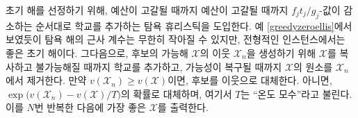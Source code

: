 \documentclass[11pt]{article} %
\newif\ifen
\theoremstyle{definition}
\theoremstyle{definition}
\begin{document}
\ifen
To generate an initial solution, our algorithm adopts the greedy heuristic of adding schools in descending order by $f_j t_j / g_j$ until the budget is exhausted. While Example \ref{greedyzeroellis} shows that the approximation coefficient of this solution can be arbitrarily small, in typical instances, it is much higher. Next, given a candidate solution $\mathcal{X}$, we generate a neighbor $\mathcal{X}_n$ by copying $\mathcal{X}$, adding schools to $\mathcal{X}_n$ until it becomes infeasible, then removing elements of $\mathcal{X}$ from $\mathcal{X}_n$ until feasibility is restored. If $v(\mathcal{X}_n) \geq v(\mathcal{X})$, then the candidate solution is updated to equal the neighbor; if not, then the candidate solution is updated with probability $\exp\bigl(v(\mathcal{X}_n) - v(\mathcal{X}) / T\bigr)$, where $T$ is a temperature parameter. This is repeated $N$ times, and the algorithm returns the best $\mathcal{X}$ observed.
\else
초기 해를 선정하기 위해, 예산이 고갈될 때까지 예산이 고갈될 때까지 $f_j t_j / g_j$-값이 감소하는 순서대로 학교를 추가하는 탐욕 휴리스틱을 도입한다. 예 \ref{greedyzeroellis}에서 보였듯이 탐욕 해의 근사 계수는 무한히 작아질 수 있지만, 전형적인 인스턴스에서는 좋은 초기 해이다. 그다음으로, 후보의 가능해 $\mathcal{X}$의 이웃 $\mathcal{X}_n$을 생성하기 위해 $\mathcal{X}$를 복사하고 불가능해질 때까지 학교를 추가하고, 가능성이 복구될 때까지 $\mathcal{X}$의 원소를 $\mathcal{X}_n$에서 제거한다. 만약 $v(\mathcal{X}_n) \geq v(\mathcal{X})$이면, 후보를 이웃으로 대체한다. 아니면, $\exp\bigl(v(\mathcal{X}_n) - v(\mathcal{X}) / T\bigr)$의 확률로 대체하며, 여기서 $T$는 ``온도 모수''라고 불린다. 이를 $N$번 반복한 다음에 가장 좋은 $\mathcal{X}$를 출력한다.
\fi
\end{document}
